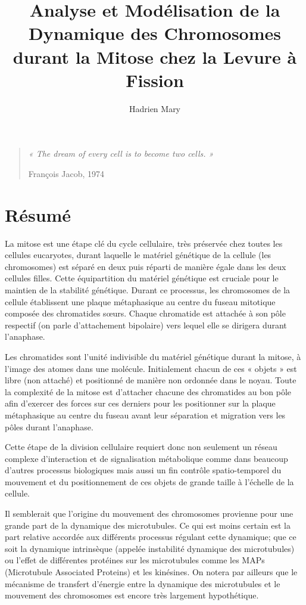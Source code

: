 \documentclass[12pt,a4paper,twoside,openright]{book}
\date{}
\title{Analyse et Modélisation de la Dynamique des Chromosomes durant la Mitose chez la Levure à Fission}
\author{Hadrien Mary}
\begin{document}
\makeflyleaf

\newpage

\pagestyle{empty}

\vspace*{\fill}

\begin{quote}
    {\centerline {\itshape « The dream of every cell is to become two cells. »}}
    \centerline{François Jacob, 1974}
  \end{quote}\vspace*{\fill}

\newpage

\cleardoublepage
\section*{Résumé}

La mitose est une étape clé du cycle cellulaire, très préservée chez
toutes les cellules eucaryotes, durant laquelle le matériel génétique de
la cellule (les chromosomes) est séparé en deux puis réparti de manière
égale dans les deux cellules filles. Cette équipartition du matériel
génétique est cruciale pour le maintien de la stabilité génétique.
Durant ce processus, les chromosomes de la cellule établissent une
plaque métaphasique au centre du fuseau mitotique composée des
chromatides sœurs. Chaque chromatide est attachée à son pôle respectif
(on parle d'attachement bipolaire) vers lequel elle se dirigera durant
l'anaphase.

Les chromatides sont l'unité indivisible du matériel génétique durant la
mitose, à l'image des atomes dans une molécule. Initialement chacun de
ces « objets » est libre (non attaché) et positionné de manière non
ordonnée dans le noyau. Toute la complexité de la mitose est d'attacher
chacune des chromatides au bon pôle afin d'exercer des forces sur ces
derniers pour les positionner sur la plaque métaphasique au centre du
fuseau avant leur séparation et migration vers les pôles durant
l'anaphase.

Cette étape de la division cellulaire requiert donc non seulement un
réseau complexe d'interaction et de signalisation métabolique comme dans
beaucoup d'autres processus biologiques mais aussi un fin contrôle
spatio-temporel du mouvement et du positionnement de ces objets de
grande taille à l'échelle de la cellule.

Il semblerait que l'origine du mouvement des chromosomes provienne pour
une grande part de la dynamique des microtubules. Ce qui est moins
certain est la part relative accordée aux différents processus régulant
cette dynamique; que ce soit la dynamique intrinsèque (appelée
instabilité dynamique des microtubules) ou l'effet de différentes
protéines sur les microtubules comme les MAPs (Microtubule Associated
Proteins) et les kinésines. On notera par ailleurs que le mécanisme de
transfert d'énergie entre la dynamique des microtubules et le mouvement
des chromosomes est encore très largement hypothétique.
\end{document}
